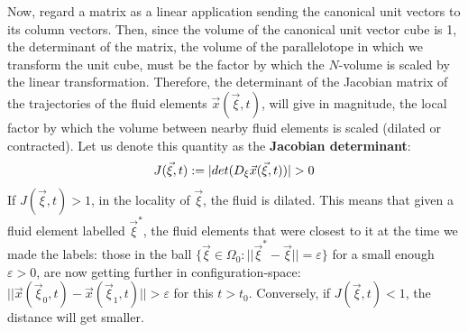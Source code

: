 \documentclass[11pt, a4paper]{article} %
\begin{document}
Now, regard a matrix as a linear application sending the canonical unit vectors to its column vectors. Then, since the volume of the canonical unit vector cube is 1, the determinant of the matrix, the volume of the parallelotope in which we transform the unit cube, must be the factor by which the $N$-volume is scaled by the linear transformation. Therefore, the determinant of the Jacobian matrix of the trajectories of the fluid elements $\vec{x}(\vec{\xi},t)$, will give in magnitude, the local factor by which the volume between nearby fluid elements is scaled (dilated or contracted). Let us denote this quantity as the {\bf Jacobian determinant}: \vspace{-0.3cm}
\begin{equation}
J(\vec{\xi},t):=|det (D_\xi \vec{x}(\vec{\xi},t))|>0 \vspace{-0.1cm}
\end{equation}
If $J(\vec{\xi},t)>1$, in the locality of $\vec{\xi}$, the fluid is dilated. This means that given a fluid element labelled $\vec{\xi}^*$, the fluid elements that were closest to it at the time we made the labels: those in the ball $\{\vec{\xi}\in\Omega_0:||\vec{\xi}^*-\vec{\xi}||=\varepsilon\}$ for a small enough $\varepsilon>0$, are now getting further in configuration-space: $||\vec{x}(\vec{\xi}_0,t)-\vec{x}(\vec{\xi}_1,t)||>\varepsilon$ for this $t>t_0$. Conversely, if $J(\vec{\xi},t)<1$, the distance will get smaller.
\end{document}
